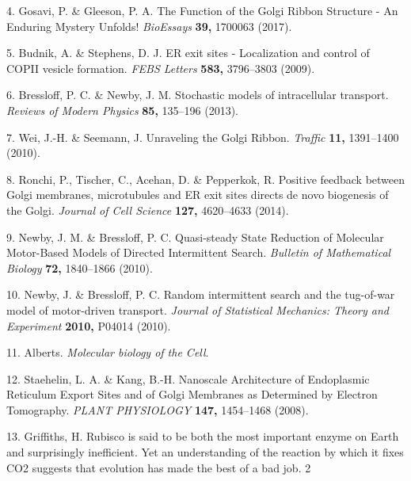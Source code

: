 \documentclass{Dissertate}
\begin{document}
\leavevmode\hypertarget{ref-gosavi_function_2017}{}%
4. Gosavi, P. \& Gleeson, P. A. The Function of the Golgi Ribbon
Structure - An Enduring Mystery Unfolds! \emph{BioEssays} \textbf{39,}
1700063 (2017).

\leavevmode\hypertarget{ref-budnik_er_2009}{}%
5. Budnik, A. \& Stephens, D. J. ER exit sites - Localization and
control of COPII vesicle formation. \emph{FEBS Letters} \textbf{583,}
3796--3803 (2009).

\leavevmode\hypertarget{ref-bressloff_stochastic_2013}{}%
6. Bressloff, P. C. \& Newby, J. M. Stochastic models of intracellular
transport. \emph{Reviews of Modern Physics} \textbf{85,} 135--196
(2013).

\leavevmode\hypertarget{ref-wei_unraveling_2010}{}%
7. Wei, J.-H. \& Seemann, J. Unraveling the Golgi Ribbon. \emph{Traffic}
\textbf{11,} 1391--1400 (2010).

\leavevmode\hypertarget{ref-ronchi_positive_2014}{}%
8. Ronchi, P., Tischer, C., Acehan, D. \& Pepperkok, R. Positive
feedback between Golgi membranes, microtubules and ER exit sites directs
de novo biogenesis of the Golgi. \emph{Journal of Cell Science}
\textbf{127,} 4620--4633 (2014).

\leavevmode\hypertarget{ref-newby_quasi-steady_2010}{}%
9. Newby, J. M. \& Bressloff, P. C. Quasi-steady State Reduction of
Molecular Motor-Based Models of Directed Intermittent Search.
\emph{Bulletin of Mathematical Biology} \textbf{72,} 1840--1866 (2010).

\leavevmode\hypertarget{ref-newby_random_2010}{}%
10. Newby, J. \& Bressloff, P. C. Random intermittent search and the
tug-of-war model of motor-driven transport. \emph{Journal of Statistical
Mechanics: Theory and Experiment} \textbf{2010,} P04014 (2010).

\leavevmode\hypertarget{ref-alberts_molecular_nodate}{}%
11. Alberts. \emph{Molecular biology of the Cell}.

\leavevmode\hypertarget{ref-staehelin_nanoscale_2008}{}%
12. Staehelin, L. A. \& Kang, B.-H. Nanoscale Architecture of
Endoplasmic Reticulum Export Sites and of Golgi Membranes as Determined
by Electron Tomography. \emph{PLANT PHYSIOLOGY} \textbf{147,} 1454--1468
(2008).

\leavevmode\hypertarget{ref-griffiths_rubisco_nodate}{}%
13. Griffiths, H. Rubisco is said to be both the most important enzyme
on Earth and surprisingly inefficient. Yet an understanding of the
reaction by which it fixes CO2 suggests that evolution has made the best
of a bad job. 2
\end{document}
